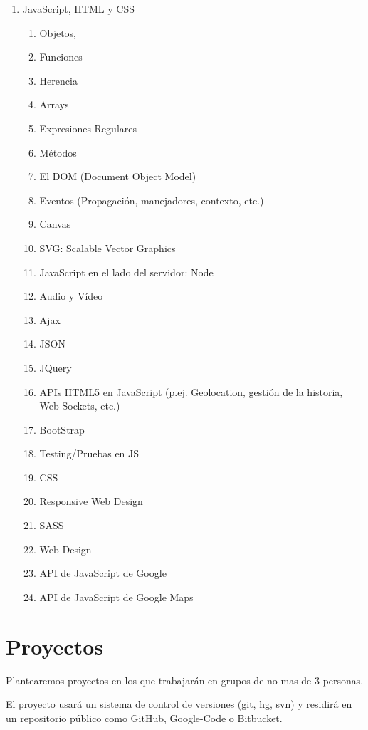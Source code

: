 \documentclass[11pt,a4paper]{article}
\begin{document}
\begin{enumerate}
\item JavaScript, HTML y CSS
  \begin{enumerate}
  \item Objetos, 
  \item Funciones 
  \item Herencia
  \item Arrays
  \item Expresiones Regulares
  \item Métodos
  \item El DOM (Document Object Model)
  \item Eventos (Propagación, manejadores, contexto, etc.)
  \item Canvas
  \item SVG: Scalable Vector Graphics
  \item JavaScript en el lado del servidor: Node
  \item Audio y Vídeo
  \item Ajax
  \item JSON
  \item JQuery
  \item APIs HTML5 en JavaScript (p.ej. Geolocation, gestión de la historia, Web Sockets, etc.)
  \item BootStrap
  \item Testing/Pruebas en JS
  \item CSS
  \item Responsive Web Design
  \item SASS
  \item Web Design
  \item API de JavaScript de Google
  \item API de JavaScript de Google Maps
  \end{enumerate}
\end{enumerate}

\section{Proyectos}
Plantearemos proyectos en los que trabajarán en grupos de no mas de 3 personas.

El proyecto usará un sistema de control de versiones (git, hg, svn) y 
residirá en un repositorio público como GitHub, Google-Code o Bitbucket.
\end{document}
